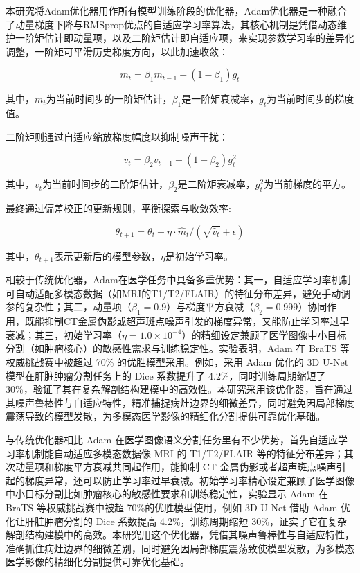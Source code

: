 本研究将Adam优化器用作所有模型训练阶段的优化器，Adam优化器是一种融合了动量梯度下降与RMSprop优点的自适应学习率算法，其核心机制是凭借动态维护一阶矩估计即动量项，以及二阶矩估计即自适应项，来实现参数学习率的差异化调整，一阶矩可平滑历史梯度方向，以此加速收敛：

\begin{equation}
    m_t = \beta_1 m_{t-1} + (1 - \beta_1) g_t
\end{equation}

其中，$m_t$为当前时间步的一阶矩估计，$\beta_1$是一阶矩衰减率，$g_t$为当前时间步的梯度值。

二阶矩则通过自适应缩放梯度幅度以抑制噪声干扰：

\begin{equation}
    v_t = \beta_2 v_{t-1} + (1 - \beta_2) g_t^2
\end{equation}

其中，$v_t$为当前时间步的二阶矩估计，$\beta_2$是二阶矩衰减率，$g_t^2$为当前梯度的平方。

最终通过偏差校正的更新规则，平衡探索与收敛效率:

\begin{equation}
    \theta_{t+1} = \theta_t - \eta \cdot \hat{m}_t / (\sqrt{\hat{v}_t} + \epsilon)
\end{equation}

其中，$\theta_{t+1}$表示更新后的模型参数，$\eta$是初始学习率。

相较于传统优化器，Adam在医学任务中具备多重优势：其一，自适应学习率机制可自动适配多模态数据（如MRI的T1/T2/FLAIR）的特征分布差异，避免手动调参的复杂性；其二，动量项（\( \beta_1=0.9 \)）与梯度平方衰减（\( \beta_2=0.999 \)）协同作用，既能抑制CT金属伪影或超声斑点噪声引发的梯度异常，又能防止学习率过早衰减；其三，初始学习率（\( \eta=1.0 \times 10^{-4} \)）的精细设定兼顾了医学图像中小目标分割（如肿瘤核心）的敏感性需求与训练稳定性。实验表明，Adam 在 BraTS 等权威挑战赛中被超过 70\% 的优胜模型采用。例如，采用 Adam 优化的 3D U-Net 模型在肝脏肿瘤分割任务上的 Dice 系数提升了 4.2\%，同时训练周期缩短了 30\%，验证了其在复杂解剖结构建模中的高效性。本研究采用该优化器，旨在通过其噪声鲁棒性与自适应特性，精准捕捉病灶边界的细微差异，同时避免因局部梯度震荡导致的模型发散，为多模态医学影像的精细化分割提供可靠优化基础。

与传统优化器相比 Adam 在医学图像语义分割任务里有不少优势，首先自适应学习率机制能自动适应多模态数据像 MRI 的 T1/T2/FLAIR 等的特征分布差异；其次动量项和梯度平方衰减共同起作用，能抑制 CT 金属伪影或者超声斑点噪声引起的梯度异常，还可以防止学习率过早衰减。初始学习率精心设定兼顾了医学图像中小目标分割比如肿瘤核心的敏感性要求和训练稳定性，实验显示 Adam 在 BraTS 等权威挑战赛中被超 70\%的优胜模型使用，例如 3D U-Net 借助 Adam 优化让肝脏肿瘤分割的 Dice 系数提高 4.2\%，训练周期缩短 30\%，证实了它在复杂解剖结构建模中的高效。本研究用这个优化器，凭借其噪声鲁棒性与自适应特性，准确抓住病灶边界的细微差别，同时避免因局部梯度震荡致使模型发散，为多模态医学影像的精细化分割提供可靠优化基础。

